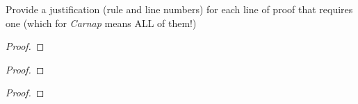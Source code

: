 
 
\clearpage



\practiceproblems

\solutions
\problempart
\label{pr.justifyPLproof}
Provide a justification (rule and line numbers) for each line of proof that requires one {\color{black}(which for \textit{Carnap} means ALL of them!)}
\begin{multicols}{2}
\begin{proof}
 {}
 {}
\end{proof}

\begin{proof}
\open
\close
{}
\end{proof}

\begin{proof}
\open
	 {}
	\open
	\close
\close
{}
\end{proof}
\end{multicols}

